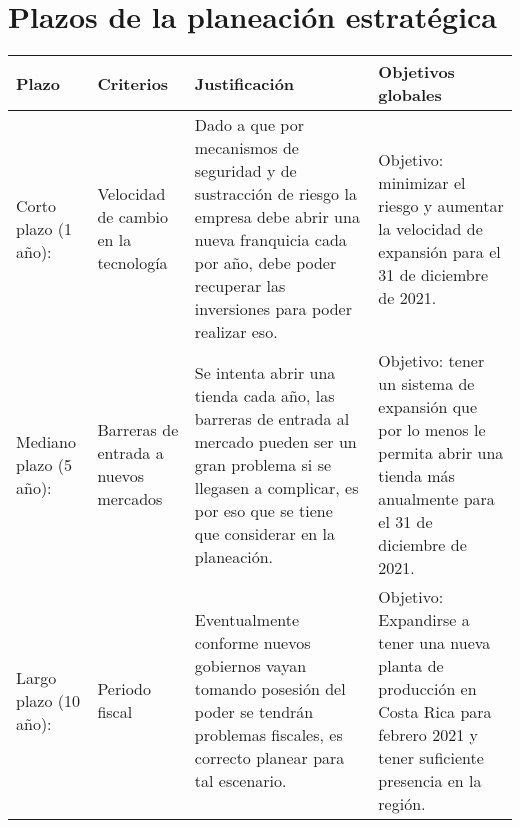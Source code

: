\documentclass{article}
\begin{document}
\section{Plazos de la planeación estratégica}
\begin{center}
    \begin{tabular}{ |p{2cm}|p{2cm}|p{5cm}|p{5cm}| }
        \hline
            Plazo & Criterios & Justificación & Objetivos globales\\
        \hline 
            Corto plazo (1 año): 
            & 
            Velocidad de cambio en la tecnología
            & 
            Dado a que por mecanismos de seguridad y de sustracción de riesgo la empresa debe abrir una nueva franquicia cada por año, debe poder recuperar las inversiones para poder realizar eso. 
            & 
            Objetivo: minimizar el riesgo y aumentar la velocidad de expansión para el 31 de diciembre de 2021.
            \\ 
        \hline
            Mediano plazo (5 año): 
            & 
            Barreras de entrada a nuevos mercados
            & 
            Se intenta abrir una tienda cada año, las barreras de entrada al mercado pueden ser un gran problema si se llegasen a complicar, es por eso que se tiene que considerar en la planeación. 
            & 
            Objetivo: tener un sistema de expansión que por lo menos le permita abrir una tienda más anualmente para el 31 de diciembre de 2021. 
            \\ 
        \hline
            Largo plazo (10 año): 
            & 
            Periodo fiscal 
            & 
            Eventualmente conforme nuevos gobiernos vayan tomando posesión del poder se tendrán problemas fiscales, es correcto planear para tal escenario. 
            & 
            Objetivo: Expandirse a tener una nueva planta de producción en Costa Rica para febrero 2021 y tener suficiente presencia en la región. 
            \\ 
        \hline
    \end{tabular}
\end{center}




\end{document}

